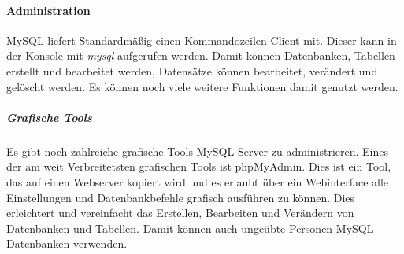 \paragraph{Administration}
MySQL liefert Standardmäßig einen Kommandozeilen-Client mit. Dieser kann in der Konsole mit \textit{mysql} aufgerufen werden. Damit können Datenbanken, Tabellen erstellt und bearbeitet werden, Datensätze können bearbeitet, verändert und gelöscht werden. Es können noch viele weitere Funktionen damit genutzt werden.\\
\subparagraph{Grafische Tools}
Es gibt noch zahlreiche grafische Tools MySQL Server zu administrieren. Eines der am weit Verbreitetsten grafischen Tools ist phpMyAdmin. Dies ist ein Tool, das auf einen Webserver kopiert wird und es erlaubt über ein Webinterface alle Einstellungen und Datenbankbefehle grafisch ausführen zu können. Dies erleichtert und vereinfacht das Erstellen, Bearbeiten und Verändern von Datenbanken und Tabellen. Damit können auch ungeübte Personen MySQL Datenbanken verwenden.

